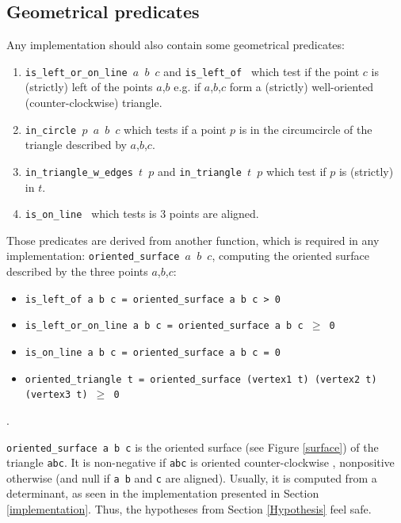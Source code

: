 \documentclass[a4paper,10pt]{article}
\def\ttt#1#2{{\tt{\color{black}#1} #2}}
\begin{document}
\subsection{Geometrical predicates}
\label{predicate}
Any implementation should also contain some geometrical predicates:
\begin{enumerate}
\item \ttt{is\_left\_or\_on\_line}{$a$ $b$ $c$} and \ttt{is\_left\_of}{} which test if the point $c$ is (strictly) left of the points $a$,$b$ e.g. if $a$,$b$,$c$ form a (strictly) well-oriented (counter-clockwise) triangle.
\item \ttt{in\_circle}{$p$ $a$ $b$ $c$} which tests if a point $p$ is in the circumcircle of the triangle described by $a$,$b$,$c$.
\item \ttt{in\_triangle\_w\_edges}{$t$ $p$} and \ttt{in\_triangle}{$t$ $p$} which test if $p$ is (strictly) in $t$.
  \item \ttt{is\_on\_line}{} which tests is 3 points are aligned.

\end{enumerate}

Those predicates are derived from another function, which is required in any implementation: \ttt{oriented\_surface}{$a$ $b$ $c$}, computing the oriented surface described by the three points $a$,$b$,$c$:
\begin{itemize}
\item \ttt{is\_left\_of}{a b c = oriented\_surface a b c > 0}
  \item \ttt{is\_left\_or\_on\_line}{a b c = oriented\_surface a b c $\geq$ 0}
  \item \ttt{is\_on\_line}{a b c = oriented\_surface a b c = 0}
 \item \ttt{oriented\_triangle}{t = oriented\_surface (vertex1 t) (vertex2 t) (vertex3 t) $\geq$ 0} 
  \end{itemize}.


  {\tt oriented\_surface a b c} is the oriented surface (see Figure \ref{surface}) of the triangle {\tt abc}. It is non-negative if {\tt abc} is oriented counter-clockwise , nonpositive otherwise (and null if {\tt a b} and {\tt c} are aligned).
Usually, it is computed from a determinant, as seen in the implementation presented in Section \ref{implementation}. Thus, the hypotheses from Section \ref{Hypothesis} feel safe.
\end{document}
